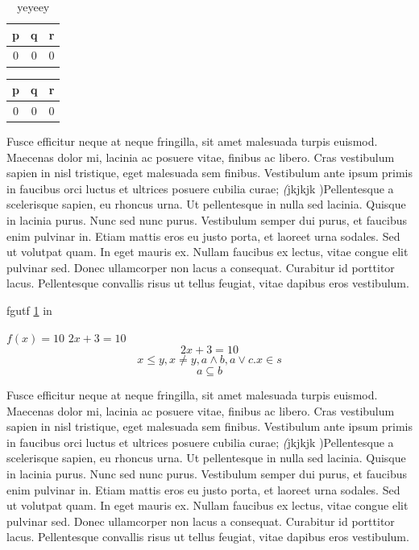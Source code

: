 \documentclass[letterpaper,12pt]{book}
\begin{document}
	\begin{table}
		\begin{tabular}{|cc|c}
			p & q & r \\
			\hline
			0 & 0 & 0
		\end{tabular}
		\caption{yeyeey}
		\label{table}
	\end{table}
	\begin{tabular}{cc|c}
		p & q & r \\
		\hline
		0 & 0 & 0
	\end{tabular}
	
	\begin{center}
			\noindent Fusce efficitur neque at neque fringilla, sit amet malesuada turpis euismod. Maecenas dolor mi, lacinia ac posuere vitae, finibus ac libero. Cras vestibulum sapien in nisl tristique, eget malesuada sem finibus. Vestibulum ante ipsum primis in faucibus orci luctus et ultrices posuere cubilia curae; \textit(jkjkjk )Pellentesque a scelerisque sapien, eu rhoncus urna. Ut pellentesque in nulla sed lacinia. Quisque in lacinia purus. Nunc sed nunc purus. Vestibulum semper dui purus, et faucibus enim pulvinar in. Etiam mattis eros eu justo porta, et laoreet urna sodales. Sed ut volutpat quam. In eget mauris ex. Nullam faucibus ex lectus, vitae congue elit pulvinar sed. Donec ullamcorper non lacus a   consequat. Curabitur id porttitor lacus. Pellentesque convallis risus ut tellus feugiat, vitae dapibus eros vestibulum. \vspace{5cm}
	\end{center}

	fgutf
	\ref{table} in \pageref{table}
	
	\(f(x) = 10\)
	$ 2x + 3 =  10$
	$$ 2x + 3 =  10$$
	$$ x \leq y, x \not= y, a \wedge b , a \vee c. x \in s$$
	$$ a \subseteq b $$

	\begin{center}
		\noindent Fusce efficitur neque at neque fringilla, sit amet malesuada turpis euismod. Maecenas dolor mi, lacinia ac posuere vitae, finibus ac libero. Cras vestibulum sapien in nisl tristique, eget malesuada sem finibus. Vestibulum ante ipsum primis in faucibus orci luctus et ultrices posuere cubilia curae; \textit(jkjkjk )Pellentesque a scelerisque sapien, eu rhoncus urna. Ut pellentesque in nulla sed lacinia. Quisque in lacinia purus. Nunc sed nunc purus. Vestibulum semper dui purus, et faucibus enim pulvinar in. Etiam mattis eros eu justo porta, et laoreet urna sodales. Sed ut volutpat quam. In eget mauris ex. Nullam faucibus ex lectus, vitae congue elit pulvinar sed. Donec ullamcorper non lacus a   consequat. Curabitur id porttitor lacus. Pellentesque convallis risus ut tellus feugiat, vitae dapibus eros vestibulum. \vspace{5cm}
	\end{center}	
\end{document}

